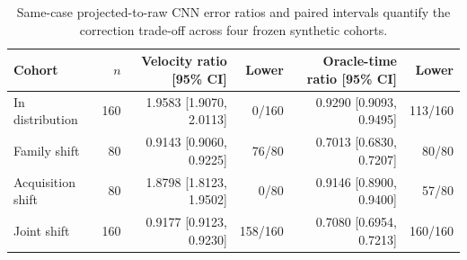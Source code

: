 \begin{table}[htbp]
\centering
\scriptsize
\caption{Same-case projected-to-raw CNN error ratios and paired intervals quantify the correction trade-off across four frozen synthetic cohorts.}
\label{tab:projection-counterfactual}
\begin{tabular}{lrrrrr}
\toprule
Cohort & $n$ & Velocity ratio [95\% CI] & Lower & Oracle-time ratio [95\% CI] & Lower \\
\midrule
In distribution & 160 & 1.9583 [1.9070, 2.0113] & 0/160 & 0.9290 [0.9093, 0.9495] & 113/160 \\
Family shift & 80 & 0.9143 [0.9060, 0.9225] & 76/80 & 0.7013 [0.6830, 0.7207] & 80/80 \\
Acquisition shift & 80 & 1.8798 [1.8123, 1.9502] & 0/80 & 0.9146 [0.8900, 0.9400] & 57/80 \\
Joint shift & 160 & 0.9177 [0.9123, 0.9230] & 158/160 & 0.7080 [0.6954, 0.7213] & 160/160 \\
\bottomrule
\end{tabular}
\end{table}
